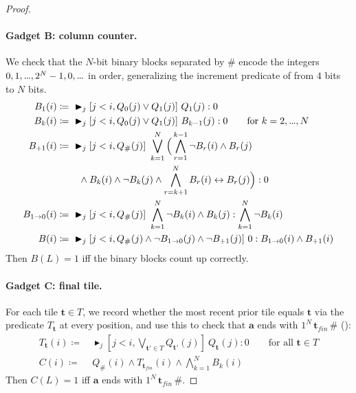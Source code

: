 \documentclass{article} %
\newcommand{\maxatt}{\blacktriangleright}
\newcommand{\bnfdef}{\coloneqq}
\newcommand{\sym}[1]{\mathrm{#1}}
\newcommand{\str}[1]{#1}
\newcommand{\bword}{\mathbf{a}}
\newcommand{\Qprop}[1]{Q_{#1}}
\newcommand{\tile}{\boldsymbol{t}}
\newcommand{\tileset}{T}
\newcommand{\tilefin}{\boldsymbol{t}_{\mathit{fin}}}
\newcommand{\mydots}{%
  \ifmmode
    \mathord{.}\mkern-1mu\mathord{.}\mkern-1mu\mathord{.}%
  \else
    .\kern-0.1em.\kern-0.1em.%
  \fi
}
\renewcommand{\dots}{\mydots}%
\begin{document}
\begin{proof}
\paragraph{Gadget B: column counter.}
We check that the $N$-bit binary blocks separated by $\sym{\#}$ encode the integers $0, 1, \dots, 2^N-1, 0, \dots$ in order, generalizing the increment predicate of  from $4$ bits to $N$ bits.
\begin{subequations}\label{eq:gadget-B}
\begin{align}
B_1(i) \bnfdef&\ \maxatt_j[j<i,\Qprop{\sym{0}}(j) \vee \Qprop{\sym{1}}(j)]\ \Qprop{\sym{1}}(j) : 0 \label{eq:B-1}\\
B_k(i) \bnfdef&\ \maxatt_j[j<i,\Qprop{\sym{0}}(j) \vee \Qprop{\sym{1}}(j)]\ B_{k-1}(j) : 0 \qquad \text{for } k = 2,\dots,N \label{eq:B-k}\\
B_{+1}(i) \bnfdef&\ \maxatt_j[j<i,\Qprop{\sym{\#}}(j)]\ \bigvee_{k=1}^N \Big(\bigwedge_{r=1}^{k-1} \neg B_r(i) \wedge B_r(j)\notag\\
&\quad \wedge B_k(i) \wedge \neg B_k(j) \wedge \bigwedge_{r=k+1}^{N} B_r(i) \leftrightarrow B_r(j)\Big) : 0 \label{eq:B-+1}\\
B_{1 \to 0}(i) \bnfdef&\ \maxatt_j[j<i,\Qprop{\sym{\#}}(j)]\ \bigwedge_{k=1}^N \neg B_k(i) \wedge B_k(j) : \bigwedge_{k=1}^N \neg B_k(i) \label{eq:B-rollover}\\
B(i) \bnfdef&\ \maxatt_j[j<i,\Qprop{\sym{\#}}(j) \wedge \neg B_{1 \to 0}(j) \wedge \neg B_{+1}(j)]\ 0 : B_{1 \to 0}(i) \wedge B_{+1}(i) \label{eq:B-final}
\end{align}
\end{subequations}
Then $B(L) = 1$ iff the binary blocks count up correctly.

\paragraph{Gadget C: final tile.}
For each tile $\tile \in \tileset$, we record whether the most recent prior tile equals $\tile$ via the predicate $T_{\tile}$ at every position, and use this to check that $\str{\bword}$ ends with $\sym{1}^N\, \tilefin\, \sym{\#}$ ():
\begin{subequations}\label{eq:gadget-C}
\begin{align}
T_{\tile}(i) \bnfdef&\ \maxatt_j[j<i,\bigvee_{\tile' \in \tileset} \Qprop{\tile'}(j)]\ \Qprop{\tile}(j) : 0 \qquad \text{for all } \tile \in \tileset \label{eq:C-T}\\
C(i) \bnfdef&\ \Qprop{\sym{\#}}(i) \wedge T_{\tilefin}(i) \wedge \bigwedge_{k=1}^N B_k(i) \label{eq:C-final}
\end{align}
\end{subequations}
Then $C(L) = 1$ iff $\str{\bword}$ ends with $\sym{1}^N\, \tilefin\, \sym{\#}$.


\end{proof}
\end{document}
